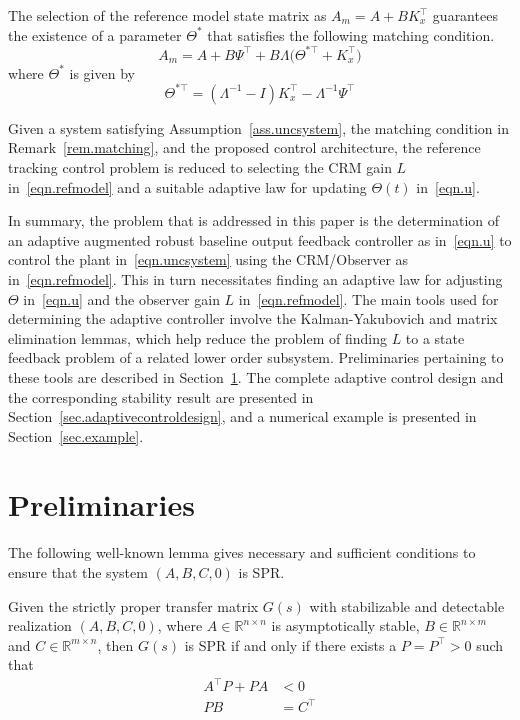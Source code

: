 \documentclass[]{../sty/aiaa-tc}
\begin{document}
  \begin{rem-dan}\label{rem.matching}
    The selection of the reference model state matrix as $A_{m}=A+BK_{x}^{\top}$ guarantees the existence of a parameter $\Theta^{*}$ that satisfies the following matching condition.
    \begin{equation*}
      A_{m}=A+B\Psi^{\top}+B\Lambda\bigr(\Theta^{*\top}+K_{x}^{\top}\bigr)
    \end{equation*}
    where $\Theta^{*}$ is given by
    \begin{equation*}
      \Theta^{*\top}=(\Lambda^{-1}-I)K_{x}^{\top}-\Lambda^{-1}\Psi^{\top}
    \end{equation*}
  \end{rem-dan}

  Given a system satisfying Assumption~\ref{ass.uncsystem}, the matching condition in Remark~\ref{rem.matching}, and the proposed control architecture, the reference tracking control problem is reduced to selecting the CRM gain $L$ in\ \eqref{eqn.refmodel} and a suitable adaptive law for updating $\Theta(t)$ in\ \eqref{eqn.u}.

  In summary, the problem that is addressed in this paper is the determination of an adaptive augmented robust baseline output feedback controller as in\ \eqref{eqn.u} to control the plant in\ \eqref{eqn.uncsystem} using the CRM/Observer as in\ \eqref{eqn.refmodel}.
  This in turn necessitates finding an adaptive law for adjusting $\Theta$ in\ \eqref{eqn.u} and the observer gain $L$ in\ \eqref{eqn.refmodel}.
  The main tools used for determining the adaptive controller involve the Kalman-Yakubovich\cite{narendra.stable.2005} and matrix elimination lemmas\cite{boyd.lmibook.1994}, which help reduce the problem of finding $L$ to a state feedback problem of a related lower order subsystem.
  Preliminaries pertaining to these tools are described in Section~\ref{sec.preliminaries}.
  The complete adaptive control design and the corresponding stability result are presented in Section~\ref{sec.adaptivecontroldesign}, and a numerical example is presented in Section~\ref{sec.example}.

  \section{Preliminaries}\label{sec.preliminaries}

  The following well-known lemma gives necessary and sufficient conditions to ensure that the system $(A,B,C,0)$ is SPR.\@
  \begin{lem-dan}\label{lem.KY}
    Given the strictly proper transfer matrix $G(s)$ with stabilizable and detectable realization $(A,B,C,0)$, where $A\in\mathbb{R}^{n\times n}$ is asymptotically stable, $B\in\mathbb{R}^{n\times m}$ and $C\in\mathbb{R}^{m\times n}$, then $G(s)$ is SPR if and only if there exists a $P=P^{\top}>0$ such that
    \begin{align}
      \label{eqn.lyapal2}
      A^{\top}P+PA&<0 \\
      \label{eqn.pbc}
      PB&=C^{\top}
    \end{align}
  \end{lem-dan}
\end{document}
